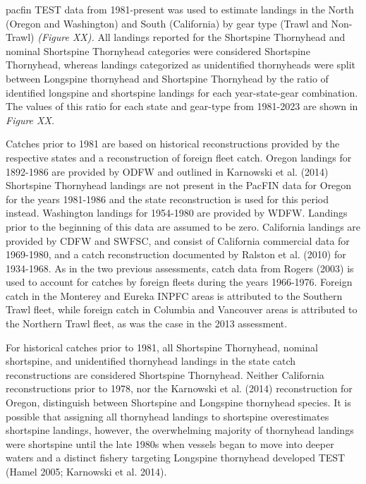 \documentclass[11pt,
  english,
  letterpaper,
]{article}
\begin{document}
\Gls{pacfin} TEST data from 1981-present was used to estimate landings in the North (Oregon and Washington) and South (California) by gear type (Trawl and Non-Trawl) \emph{\emph{(Figure XX).}} All landings reported for the Shortspine Thornyhead and nominal Shortspine Thornyhead categories were considered Shortspine Thornyhead, whereas landings categorized as unidentified thornyheads were split between Longspine thornyhead and Shortspine Thornyhead by the ratio of identified longspine and shortspine landings for each year-state-gear combination. The values of this ratio for each state and gear-type from 1981-2023 are shown in \emph{\emph{Figure XX.}}

Catches prior to 1981 are based on historical reconstructions provided by the respective states and a reconstruction of foreign fleet catch. Oregon landings for 1892-1986 are provided by ODFW and outlined in Karnowski et al. (2014) Shortspine Thornyhead landings are not present in the PacFIN data for Oregon for the years 1981-1986 and the state reconstruction is used for this period instead. Washington landings for 1954-1980 are provided by WDFW. Landings prior to the beginning of this data are assumed to be zero. California landings are provided by CDFW and SWFSC, and consist of California commercial data for 1969-1980, and a catch reconstruction documented by Ralston et al. (2010) for 1934-1968. As in the two previous assessments, catch data from Rogers (2003) is used to account for catches by foreign fleets during the years 1966-1976. Foreign catch in the Monterey and Eureka INPFC areas is attributed to the Southern Trawl fleet, while foreign catch in Columbia and Vancouver areas is attributed to the Northern Trawl fleet, as was the case in the 2013 assessment.

For historical catches prior to 1981, all Shortspine Thornyhead, nominal shortspine, and unidentified thornyhead landings in the state catch reconstructions are considered Shortspine Thornyhead. Neither California reconstructions prior to 1978, nor the Karnowski et al. (2014) reconstruction for Oregon, distinguish between Shortspine and Longspine thornyhead species. It is possible that assigning all thornyhead landings to shortspine overestimates shortspine landings, however, the overwhelming majority of thornyhead landings were shortspine until the late 1980s when vessels began to move into deeper waters and a distinct fishery targeting Longspine thornyhead developed TEST (Hamel 2005; Karnowski et al. 2014).
\end{document}
